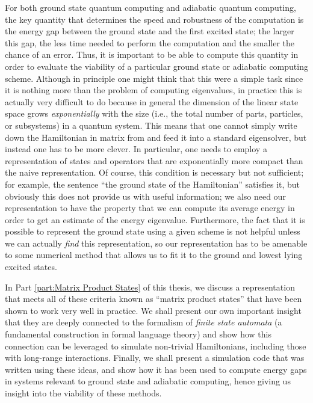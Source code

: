 \documentclass[12pt]{amsbook}
\theoremstyle{plain}
\theoremstyle{definition}
\theoremstyle{remark}
\begin{document}
For both ground state quantum computing and adiabatic quantum computing, the key quantity that determines the speed and robustness of the computation is the energy gap between the ground state and the first excited state;  the larger this gap, the less time needed to perform the computation and the smaller the chance of an error.  Thus, it is important to be able to compute this quantity in order to evaluate the viability of a particular ground state or adiabatic computing scheme.  Although in principle one might think that this were a simple task since it is nothing more than the problem of computing eigenvalues, in practice this is actually very difficult to do because in general the dimension of the linear state space grows \emph{exponentially} with the size (i.e., the total number of parts, particles, or subsystems) in a quantum system.  This means that one cannot simply write down the Hamiltonian in matrix from and feed it into a standard eigensolver, but instead one has to be more clever.  In particular, one needs to employ a representation of states and operators that are exponentially more compact than the naive representation.  Of course,  this condition is necessary but not sufficient;  for example, the sentence ``the ground state of the Hamiltonian'' satisfies it, but obviously this does not provide us with useful information;  we also need our representation to have the property that we can compute its average energy in order to get an estimate of the energy eigenvalue.  Furthermore, the fact that it is possible to represent the ground state using a given scheme is not helpful unless we can actually \emph{find} this representation, so our representation has to be amenable to some numerical method that allows us to fit it to the ground and lowest lying excited states.

In Part \ref{part:Matrix Product States} of this thesis, we discuss a representation that meets all of these criteria known as ``matrix product states'' that have been shown to work very well in practice.  We shall present our own important insight that they are deeply connected to the formalism of \emph{finite state automata} (a fundamental construction in formal language theory) and show how this connection can be leveraged to simulate non-trivial Hamiltonians, including those with long-range interactions.  Finally, we shall present a simulation code that was written using these ideas, and show how it has been used to compute energy gaps in systems relevant to ground state and adiabatic computing, hence giving us insight into the viability of these methods.
\end{document}
